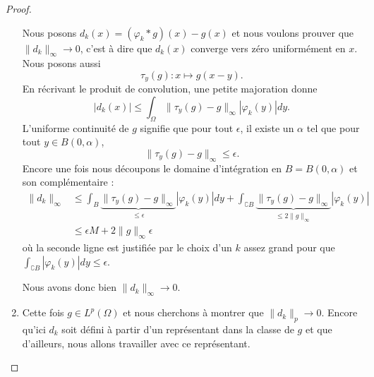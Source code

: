 \begin{proof}
\begin{enumerate}
            Nous posons \( d_k(x)=(\varphi_k*g)(x)-g(x)\) et nous voulons prouver que \( \| d_k \|_{\infty}\to 0\), c'est à dire que \( d_k(x)\) converge vers zéro uniformément en \( x\). Nous posons aussi
            \begin{equation}
                \tau_y(g)\colon x\mapsto g(x-y).
            \end{equation}
            En récrivant le produit de convolution, une petite majoration donne
            \begin{equation}
                | d_k(x) |\leq \int_{\Omega}\| \tau_y(g)-g \|_{\infty}| \varphi_k(y) |dy.
            \end{equation}
            L'uniforme continuité de \( g\) signifie que pour tout \( \epsilon\), il existe un \( \alpha\) tel que pour tout \( y\in B(0,\alpha)\),
            \begin{equation}
                \| \tau_y(g)-g \|_{\infty}\leq \epsilon.
            \end{equation}
            Encore une fois nous découpons le domaine d'intégration en \( B=B(0,\alpha)\) et son complémentaire :
            \begin{subequations}
                \begin{align}
                    \| d_k \|_{\infty}&\leq\int_B\underbrace{\| \tau_y(g)-g \|_{\infty}}_{\leq \epsilon}| \varphi_k(y) |dy+\int_{\complement B}\underbrace{\| \tau_y(g)-g \|_{\infty}}_{\leq 2\| g \|_{\infty}}| \varphi_k(y) |\\
                    &\leq \epsilon M+2\| g \|_{\infty}\epsilon
                \end{align}
            \end{subequations}
            où la seconde ligne est justifiée par le choix d'un \( k\) assez grand pour que \( \int_{\complement B}| \varphi_k(y) |dy\leq \epsilon\).

            Nous avons donc bien \( \| d_k \|_{\infty}\to 0\).

        \item

            Cette fois \( g\in L^p(\Omega)\) et nous cherchons à montrer que \( \| d_k \|_p\to 0\). Encore qu'ici \( d_k\) soit défini à partir d'un représentant dans la classe de \( g\) et que d'ailleurs, nous allons travailler avec ce représentant.


\end{enumerate}
\end{proof}
